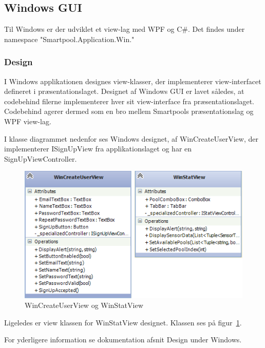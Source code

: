 \subsection{Windows GUI}
Til Windows er der udviklet et view-lag med WPF og C\#. Det findes under namespace "Smartpool.Application.Win."

\subsubsection{Design}
I Windows applikationen designes view-klasser, der implementerer view-interfacet defineret i præsentationslaget.
Designet af Windows GUI er lavet således, at codebehind filerne implementerer hver sit view-interface fra præsentationslaget. Codebehind agerer dermed som en bro mellem Smartpools præsentationslag og WPF view-lag.

I klasse diagrammet nedenfor ses Windows designet, af WinCreateUserView, der implementerer ISignUpView fra applikationslaget og har en SignUpViewController.

\begin{figure}
	\centering
	\includegraphics[width=0.7\linewidth]{figs/design/wincreateuserandwinstatviewview}
	\caption{WinCreateUserView og WinStatView}
	\label{fig:wincreateuserandwinstatviewview}
\end{figure}

Ligeledes er view klassen for WinStatView designet.
Klassen ses på figur~\ref{fig:wincreateuserandwinstatviewview}.

For yderligere information se dokumentation afsnit Design under Windows.
